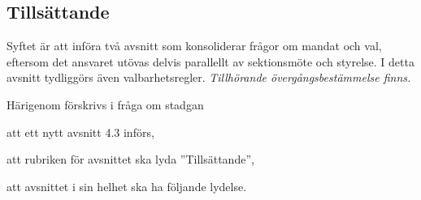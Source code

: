 \documentclass{article}
\begin{document}
\subsection{Tillsättande} \label{4.x:tillsättande}
Syftet är att införa två avsnitt som konsoliderar frågor om mandat och val, eftersom det ansvaret utövas delvis parallellt av sektionsmöte och styrelse.
I detta avsnitt tydliggörs även valbarhetsregler.
\emph{Tillhörande övergångsbestämmelse finns.}

Härigenom förskrivs i fråga om stadgan
\begin{dels}
    \item att ett nytt avsnitt 4.3 införs,
    \item att rubriken för avsnittet ska lyda ''Tillsättande'',
    \item att avsnittet i sin helhet ska ha följande lydelse.
\end{dels}
\end{document}
